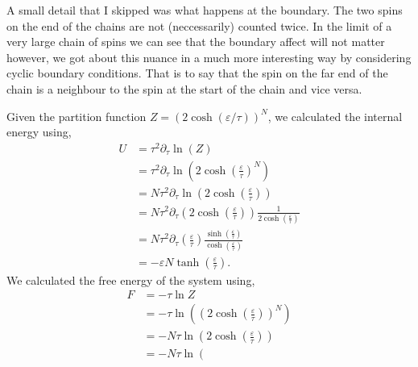 \documentclass[a4paper]{article}
\begin{document}
\begin{multicols}{2}
        A small detail that I skipped was what happens at the boundary. %
        The two spins on the end of the chains are not (neccessarily) %
        counted twice. In the limit of a very large chain of spins we %
        can see that the boundary affect will not matter however, we %
        got about this nuance in a much more interesting way by considering %
        cyclic boundary conditions. That is to say that the spin on the %
        far end of the chain is a neighbour to the spin at the start of the %
        chain and vice versa. 


        Given the partition function \(Z = (2\cosh(\varepsilon / \tau))^{N}\), we 
        calculated the internal energy using,
        \begin{align}
            U &= \tau^{2}\partial_{\tau}\ln(Z)\label{EQN1}\\
                &= \tau^{2}\partial_{\tau}
                    \ln\left(2\cosh\left(\frac{\varepsilon}{\tau}\right)^{N}\right)
                    \nonumber \\
                &= N\tau^{2}\partial_{\tau}
                    \ln\left(2\cosh\left(\frac{\varepsilon}{\tau}\right)\right)
                    \nonumber \\
                &= N\tau^{2}\partial_{\tau}
                    \left(2\cosh\left(\frac{\varepsilon}{\tau}\right)\right)
                    \frac{1}{2\cosh\left(\frac{\varepsilon}{\tau}\right)}
                    \nonumber \\
                &= N\tau^{2}\partial_{\tau}\left(\frac{\varepsilon}{\tau}\right)
                    \frac{\sinh\left(\frac{\varepsilon}{\tau}\right)}
                    {\cosh\left(\frac{\varepsilon}{\tau}\right)}\nonumber \\
                &= -\varepsilon N\tanh\left(\frac{\varepsilon}{\tau}\right)
                    \label{EQN2}.
        \end{align}
        We calculated the free energy of the system using,
        \begin{align}
            F &= -\tau\ln Z \label{EQN3}\\
                &= -\tau\ln\left(\left(
                    2\cosh\left(\frac{\varepsilon}{\tau}\right)\right)^{N}\right) 
                    \nonumber \\
                &= -N\tau\ln\left(
                    2\cosh\left(\frac{\varepsilon}{\tau}\right)\right) 
                    \nonumber \\
                &= -N\tau\ln\left(

\end{align}
\end{multicols}
\end{document}
